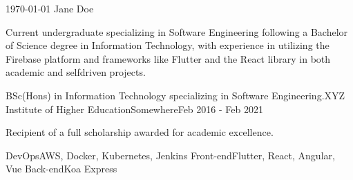 \documentclass[11pt, a4paper]{awesome-cv}
\begin{document}
\makecvheader[C]

\makecvfooter
  {\today}
  {Jane Doe}
  {\thepage}


        \begin{cvparagraph}

        Current undergraduate specializing in Software Engineering following a Bachelor of Science degree in Information Technology, with experience in utilizing the Firebase platform and frameworks like Flutter and the React library in both academic and selfdriven projects.
        \end{cvparagraph}

        

        \begin{cventries}

        
                  \cventry
                {BSc(Hons) in Information Technology specializing in Software Engineering.}{XYZ Institute of Higher Education}{Somewhere}{Feb 2016 - Feb 2021}
                        {
                          \begin{cvitems}
                            \item{Recipient of a full scholarship awarded for academic excellence.}
                          \end{cvitems}
                        }
        \end{cventries}

        

        \begin{cvskills}

        
                  \cvskill
                {DevOps}{AWS, Docker, Kubernetes, Jenkins}
                  \cvskill
                {Front-end}{Flutter, React, Angular, Vue}
                  \cvskill
                {Back-end}{Koa Express}
        \end{cvskills}

        
\end{document}
